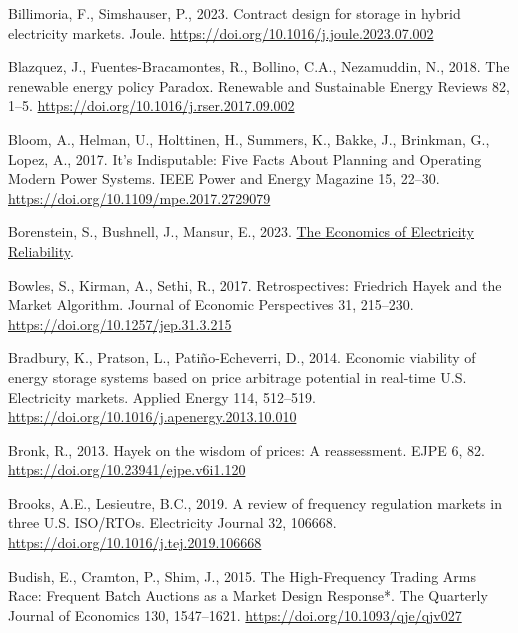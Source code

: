 \documentclass[12pt,a4paper,]{report}
\newlength{\cslhangindent}
\newenvironment{CSLReferences}[2] %
 {%
  \setlength{\parindent}{0pt}
  \ifodd #1 \everypar{\setlength{\hangindent}{\cslhangindent}}\ignorespaces\fi
  \ifnum #2 > 0
  \setlength{\parskip}{#2\baselineskip}
  \fi
 }%
 {}
\begin{document}
\begin{CSLReferences}{1}{0}
\leavevmode{}%
Billimoria, F., Simshauser, P., 2023. Contract design for storage in
hybrid electricity markets. Joule.
\url{https://doi.org/10.1016/j.joule.2023.07.002}

\leavevmode{}%
Blazquez, J., Fuentes-Bracamontes, R., Bollino, C.A., Nezamuddin, N.,
2018. The renewable energy policy {Paradox}. Renewable and Sustainable
Energy Reviews 82, 1--5.
\url{https://doi.org/10.1016/j.rser.2017.09.002}

\leavevmode{}%
Bloom, A., Helman, U., Holttinen, H., Summers, K., Bakke, J., Brinkman,
G., Lopez, A., 2017. It's {Indisputable}: {Five Facts About Planning}
and {Operating Modern Power Systems}. IEEE Power and Energy Magazine 15,
22--30. \url{https://doi.org/10.1109/mpe.2017.2729079}

\leavevmode{}%
Borenstein, S., Bushnell, J., Mansur, E., 2023.
\href{https://haas.berkeley.edu/wp-content/uploads/WP336.pdf}{The
{Economics} of {Electricity Reliability}}.

\leavevmode{}%
Bowles, S., Kirman, A., Sethi, R., 2017. Retrospectives: {Friedrich
Hayek} and the {Market Algorithm}. Journal of Economic Perspectives 31,
215--230. \url{https://doi.org/10.1257/jep.31.3.215}

\leavevmode{}%
Bradbury, K., Pratson, L., Patiño-Echeverri, D., 2014. Economic
viability of energy storage systems based on price arbitrage potential
in real-time {U}.{S}. Electricity markets. Applied Energy 114, 512--519.
\url{https://doi.org/10.1016/j.apenergy.2013.10.010}

\leavevmode{}%
Bronk, R., 2013. Hayek on the wisdom of prices: A reassessment. EJPE 6,
82. \url{https://doi.org/10.23941/ejpe.v6i1.120}

\leavevmode{}%
Brooks, A.E., Lesieutre, B.C., 2019. A review of frequency regulation
markets in three {U}.{S}. {ISO}/{RTOs}. Electricity Journal 32, 106668.
\url{https://doi.org/10.1016/j.tej.2019.106668}

\leavevmode{}%
Budish, E., Cramton, P., Shim, J., 2015. The {High-Frequency Trading
Arms Race}: {Frequent Batch Auctions} as a {Market Design Response}*.
The Quarterly Journal of Economics 130, 1547--1621.
\url{https://doi.org/10.1093/qje/qjv027}


\end{CSLReferences}
\end{document}
